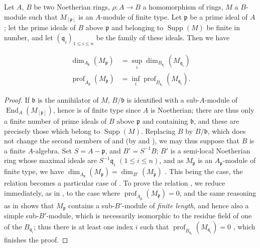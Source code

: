 \begin{proposition}[5.7.9]
\label{IV.5.7.9}
Let $A$, $B$ be two Noetherian rings, $\rho:A\to B$ a homomorphism of rings, $M$ a $B$-module such that $M_{[\mathfrak{p}]}$ is an $A$-module of finite type.
Let $\mathfrak{p}$ be a prime ideal of $A$; let the prime ideals of $B$ above $\mathfrak{p}$ and belonging to $\operatorname{Supp}(M)$ be finite in number, and let $(\mathfrak{q}_i)_{1\leqslant i\leqslant n}$ be the family of these ideals.
Then we have
\end{proposition}

\begin{align}
\label{IV.5.7.9.1}
\dim_{A_\mathfrak{p}}(M_\mathfrak{p}) &= \sup_i \dim_{B_{\mathfrak{q}_i}}(M_{\mathfrak{q}_i}) \tag{5.7.9.1}\\
\label{IV.5.7.9.2}
\operatorname{prof}_{A_\mathfrak{p}}(M_\mathfrak{p}) &= \inf_i \operatorname{prof}_{B_{\mathfrak{q}_i}}(M_{\mathfrak{q}_i}). \tag{5.7.9.2}
\end{align}

\begin{proof}
If $\mathfrak{b}$ is the annihilator of $M$, $B/\mathfrak{b}$ is identified with a sub-$A$-module of $\operatorname{End}_A(M_{[\mathfrak{p}]})$, hence is of finite type since $A$ is Noetherian; there are thus only a finite number of prime ideals of $B$ above $\mathfrak{p}$ and containing $\mathfrak{b}$, and these are precisely those which belong to $\operatorname{Supp}(M)$.
Replacing $B$ by $B/\mathfrak{b}$, which does not change the second members of  and  (by  and ), we may thus suppose that $B$ is a finite $A$-algebra.
Set $S=A-\mathfrak{p}$, and $B'=S^{-1}B$; $B'$ is a semi-local Noetherian ring whose maximal ideals are $S^{-1}\mathfrak{q}_i$ $(1\leqslant i\leqslant n)$, and as $M_\mathfrak{p}$ is an $A_\mathfrak{p}$-module of finite type, we have $\dim_{A_\mathfrak{p}}(M_\mathfrak{p})=\dim_{B'}(M_\mathfrak{p})$ .
This being the case, the relation  becomes a particular case of .
To prove the relation , we reduce immediately, as in , to the case where $\operatorname{prof}_{A_\mathfrak{p}}(M_\mathfrak{p})=0$, and the same reasoning as in  shows that $M_\mathfrak{p}$ contains a sub-$B'$-module of \emph{finite length}, and hence also a simple sub-$B'$-module, which is necessarily isomorphic to the residue field of one of the $B_{\mathfrak{q}_i}$; thus there is at least one index $i$ such that $\operatorname{prof}_{B_{\mathfrak{q}_i}}(M_{\mathfrak{q}_i})=0$ , which finishes the proof.
\end{proof}

